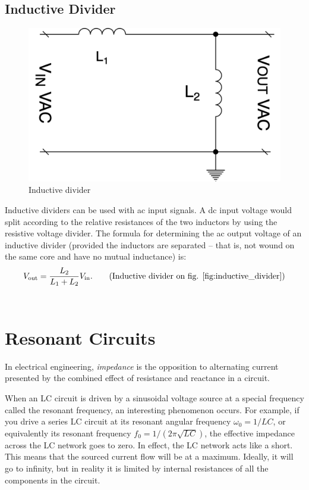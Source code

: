 \documentclass[../../document]{subfiles}
\begin{document}
\subsection{Inductive Divider}
\begin{figure}
	\begin{center}
		\includegraphics[width=\linewidth]{inductive_divider.drawio.png}
	\end{center}
	\caption{Inductive divider}\label{fig:inductive_divider}
\end{figure}
Inductive dividers can be used with ac input signals. A dc input voltage would
split according to the relative resistances of the two inductors by using the
resistive voltage divider. The formula for determining the ac output voltage of
an inductive divider (provided the inductors are separated -- that is, not
wound on the same core and have no mutual inductance) is: \cite{practical_electronics}
\begin{gather}
	V_{\text{out}} = \frac{L_2}{L_1+L_2}V_{\text{in}}. \tag{Inductive divider on
	fig. \ref{fig:inductive_divider}}
\end{gather}
\\

\section{Resonant Circuits}
In electrical engineering, \emph{impedance} is the opposition to alternating
current presented by the combined effect of resistance and reactance in a
circuit. \cite{slurzberg1950essentials}

When an LC circuit is driven by a sinusoidal voltage source at a special
frequency called the resonant frequency, an interesting phenomenon occurs. For
example, if you drive a series LC circuit at its resonant angular frequency
\(\omega_0 =1/LC\), or equivalently its resonant frequency \(f_0 =
1/(2\pi\sqrt{LC})\), the effective impedance across the LC network goes to
zero. In effect, the LC network acts like a short. This means that the sourced
current flow will be at a maximum. Ideally, it will go to infinity, but in
reality it is limited by internal resistances of all the components in the
circuit. \cite{practical_electronics}
\end{document}
